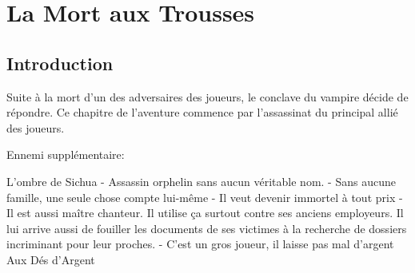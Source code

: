 \section{La Mort aux Trousses}

\subsection*{Introduction}

Suite à la mort d'un des adversaires des joueurs, le conclave du vampire décide de répondre.
Ce chapitre de l'aventure commence par l'assassinat du principal allié des joueurs.

Ennemi supplémentaire:

L'ombre de Sichua
 - Assassin orphelin sans aucun véritable nom.
 - Sans aucune famille, une seule chose compte lui-même
 - Il veut devenir immortel à tout prix
 - Il est aussi maître chanteur. Il utilise ça surtout contre ses anciens
   employeurs. Il lui arrive aussi de fouiller les documents de ses
   victimes à la recherche de dossiers incriminant pour leur proches.
 - C'est un gros joueur, il laisse pas mal d'argent Aux Dés d'Argent



